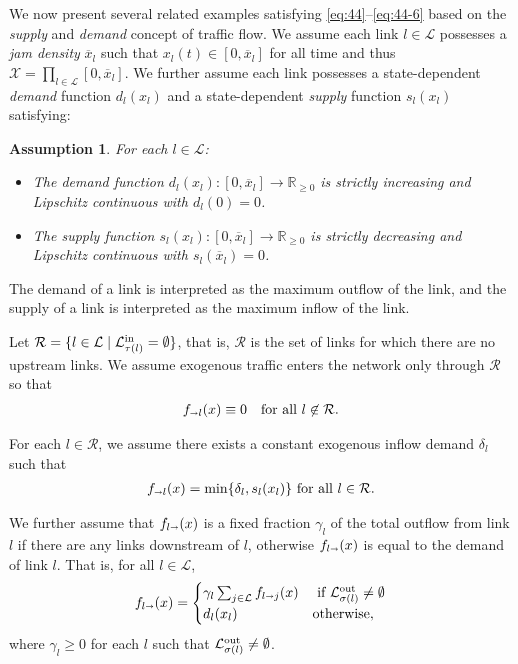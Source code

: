 \documentclass[letterpaper, 10 pt, conference]{ieeeconf}
\newcommand{\sra}{\shortrightarrow}
\newtheorem{assum}{Assumption}
\newcommand{\dens}{x}
\newcommand{\fluxin}{s}
\newcommand{\fluxout}{d}
\newcommand{\densjam}{\overline{\dens}}
\newcommand{\Links}{\mathcal{L}}
\newcommand{\Lin}{\mathcal{L}^\textnormal{in}}
\newcommand{\Lout}{\mathcal{L}^\textnormal{out}}
\newcommand{\Ramps}{\mathcal{R}}
\newcommand{\head}{{\sigma}}
\newcommand{\tail}{{\tau}}
\newcommand{\Dom}{\mathcal{X}}
\newcommand{\flow}{f}
\begin{document}
We now present several related examples satisfying \ref{eq:44}--\ref{eq:44-6} based on the \emph{supply} and \emph{demand} concept of traffic flow. We assume each link $l\in\Links$ possesses a \emph{jam density} $\densjam_l$ such that $\dens_l(t)\in[0,\densjam_l]$ for all time and thus $\Dom=\prod_{l\in\Links}[0,\densjam_l]$. We further assume each link possesses a state-dependent \emph{demand} function $\fluxout_l(x_l)$ and a state-dependent \emph{supply} function $\fluxin_l(x_l)$ satisfying:
\begin{assum}
\label{assum:2}
  For each $l\in\Links$:
  \begin{itemize}
  \item The demand function $\fluxout_l(\dens_l):[0,\densjam_l]\to \mathbb{R}_{\geq 0}$ is strictly increasing and Lipschitz continuous with $\fluxout_l(0)=0$.
  \item The supply function $\fluxin_l(\dens_l):[0,\densjam_l]\to \mathbb{R}_{\geq 0}$ is strictly decreasing and Lipschitz continuous with $\fluxin_l(\densjam_l)=0$.
  \end{itemize}
\end{assum}

The demand of a link is interpreted as the maximum outflow of the link, and the supply of a link is interpreted as the maximum inflow of the link. 

Let $\Ramps=\{l\in\Links \mid \Lin_{\tail(l)}=\emptyset\}$, that is, $\Ramps$ is the set of links for which there are no upstream links. We assume exogenous traffic enters the network only through $\Ramps$ so that
\begin{align}
  \label{eq:39}
f_{\sra l}(x)\equiv 0\quad \text{for all }l\not\in\Ramps.
\end{align}

For each $l\in\Ramps$, we assume there exists a constant exogenous inflow demand $\delta_l$ such that
\begin{align}
  \label{eq:40}
  \flow_{\sra l}(x) = \min\{\delta_l,\fluxin_l(x_l)\}\text{ for all }l\in\Ramps.
\end{align}

We further assume that $\flow_{l\sra}(x)$ is a fixed fraction $\gamma_l$ of the total outflow from link $l$ if there are any links downstream of $l$, otherwise $\flow_{l\sra}(x)$ is equal to the demand of link $l$. That is, for all $l\in\Links$,
\begin{align}
  \label{eq:41}
  \flow_{l\sra}(x)=\begin{cases}\gamma_l \sum_{j\in\Links}\flow_{l\sra j}(x)& \text{ if } \Lout_{\head(l)}\neq \emptyset\\
\fluxout_l(x_l)&\text{otherwise},
\end{cases}
\end{align}
where $\gamma_l\geq 0$ for each $l$ such that $\Lout_{\head(l)}\neq \emptyset$.
\end{document}
